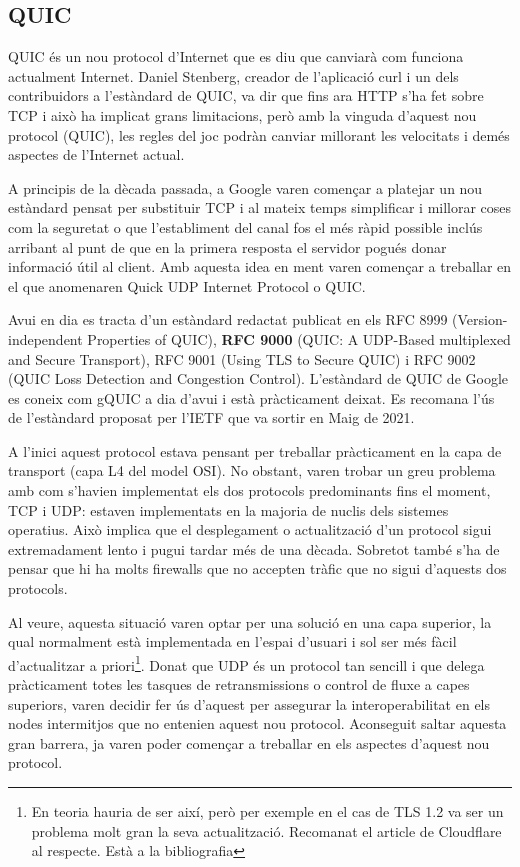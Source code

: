 \subsection{QUIC}
{   
    QUIC és un nou protocol d'Internet que es diu que canviarà com funciona actualment Internet. Daniel Stenberg, creador de
    l'aplicació curl i un dels contribuidors a l'estàndard de QUIC, va dir que fins ara HTTP s'ha fet sobre TCP i això ha
    implicat grans limitacions, però amb la vinguda d'aquest nou protocol (QUIC), les regles del joc podràn canviar 
    millorant les velocitats i demés aspectes de l'Internet actual. 
    
    A principis de la dècada passada, a Google varen començar a platejar un nou estàndard pensat per substituir TCP i al mateix
    temps simplificar i millorar coses com la seguretat o que l'establiment del canal fos el més ràpid possible inclús arribant
    al punt de que en la primera resposta el servidor pogués donar informació útil al client. Amb aquesta idea en ment varen
    començar a treballar en el que anomenaren Quick UDP Internet Protocol o QUIC. 

    Avui en dia es tracta d'un estàndard redactat publicat en els RFC 8999 (Version-independent Properties of QUIC),
    \textbf{RFC 9000} (QUIC: A UDP-Based multiplexed and Secure Transport), RFC 9001 (Using TLS to Secure QUIC) i RFC 9002 (QUIC Loss
    Detection and Congestion Control). L'estàndard de QUIC de Google es coneix com gQUIC a dia d'avui i està pràcticament deixat.
    Es recomana l'ús de l'estàndard proposat per l'IETF que va sortir en Maig de 2021.

    A l'inici aquest protocol estava pensant per treballar pràcticament en la capa de transport (capa L4 del model OSI). No obstant,
    varen trobar un greu problema amb com s'havien implementat els dos protocols predominants fins el moment, TCP i UDP: estaven 
    implementats en la majoria de nuclis dels sistemes operatius. Això implica que el desplegament o actualització d'un protocol 
    sigui extremadament lento i pugui tardar més de una dècada. Sobretot també s'ha de pensar que hi ha molts firewalls que 
    no accepten tràfic que no sigui d'aquests dos protocols.

    Al veure, aquesta situació varen optar per una solució en una capa superior, la qual normalment està implementada en l'espai d'usuari i 
    sol ser més fàcil d'actualitzar a priori\footnote{En teoria hauria de ser així, però per exemple en el cas de TLS 1.2 va ser un problema
    molt gran la seva actualització. Recomanat el article de Cloudflare al respecte. Està a la bibliografia}. Donat que UDP és un protocol
    tan sencill i que delega pràcticament totes les tasques de retransmissions o control de fluxe a capes superiors, varen decidir fer ús
    d'aquest per assegurar la interoperabilitat en els nodes intermitjos que no entenien aquest nou protocol. Aconseguit saltar aquesta 
    gran barrera, ja varen poder començar a treballar en els aspectes d'aquest nou protocol.
}

